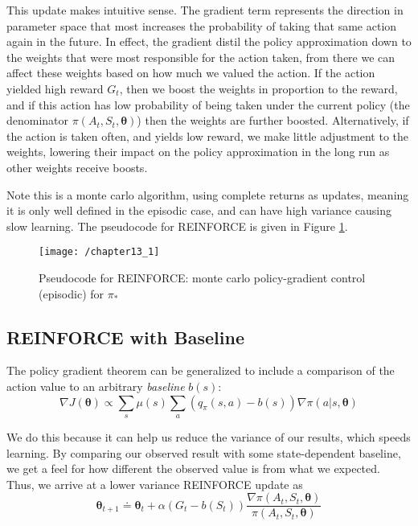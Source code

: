 This update makes intuitive sense. The gradient term represents the direction in parameter space that most increases the probability of taking that same action again in the future. In effect, the gradient distil the policy approximation down to the weights that were most responsible for the action taken, from there we can affect these weights based on how much we valued the action. If the action yielded high reward $G_t$, then we boost the weights in proportion to the reward, and if this action has low probability of being taken under the current policy (the denominator $\pi(A_t, S_t, \boldsymbol{\theta})$) then the weights are further boosted. Alternatively, if the action is taken often, and yields low reward, we make little adjustment to the weights, lowering their impact on the policy approximation in the long run as other weights receive boosts.

Note this is a monte carlo algorithm, using complete returns as updates, meaning it is only well defined in the episodic case, and can have high variance causing slow learning. The pseudocode for REINFORCE is given in Figure \ref{fig: 13_1}.
\begin{figure}
	\centering
	\texttt{[image: /chapter13\_1]}
	\caption{Pseudocode for REINFORCE: monte carlo policy-gradient control (episodic) for $\pi_*$}
	\label{fig: 13_1}
\end{figure}

\subsection{REINFORCE with Baseline}
The policy gradient theorem can be generalized to include a comparison of the action value to an arbitrary \textit{baseline} $b(s)$:
\begin{equation}
\nabla J(\boldsymbol{\theta}) \propto \sum_{s} \mu(s) \sum_{a} \left( q_\pi(s,a) - b(s) \right) \nabla \pi(a|s, \boldsymbol{\theta})
\end{equation}

We do this because it can help us reduce the variance of our results, which speeds learning. By comparing our observed result with some state-dependent baseline, we get a feel for how different the observed value is from what we expected. Thus, we arrive at a lower variance REINFORCE update as
\begin{equation}
\boldsymbol{\theta}_{t+1} \doteq \boldsymbol{\theta}_{t} + \alpha \left(G_t - b(S_t) \right) \frac{\nabla \pi(A_t, S_t, \boldsymbol{\theta})}{\pi(A_t, S_t, \boldsymbol{\theta})}
\end{equation}

